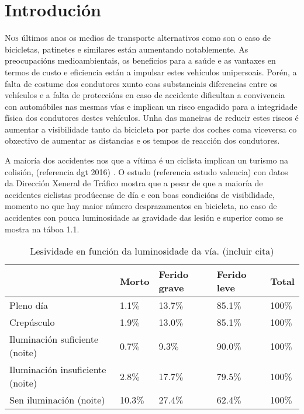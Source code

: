 \chapter{Introdución}
\label{chap:introducion}

\lettrine{N}{os} últimos anos os medios de transporte alternativos como son o caso de bicicletas, patinetes e similares están aumentando notablemente. As preocupacións medioambientais, os beneficios para a saúde e as vantaxes en termos de custo e eficiencia están a impulsar estes vehículos unipersoais. Porén, a falta de costume dos condutores xunto coas substanciais diferencias entre os vehículos e a falta de proteccións en caso de accidente dificultan a convivencia con automóbiles nas mesmas vías e implican un risco engadido para a integridade física dos condutores destes vehículos. Unha das maneiras de reducir estes riscos é aumentar a visibilidade tanto da bicicleta por parte dos coches coma viceversa co obxectivo de aumentar as distancias e os tempos de reacción dos condutores.

A maioría dos accidentes nos que a vítima é un ciclista implican un turismo na colisión, (referencia dgt 2016) .
O estudo (referencia estudo valencia) con datos da Dirección Xeneral de Tráfico mostra que a pesar de que a maioría de accidentes ciclistas prodúcense de día e con boas condicións de visibilidade, momento no que hay maior número desprazamentos en bicicleta, no caso de accidentes con pouca luminosidade as gravidade das lesión e superior como se mostra na táboa 1.1.


\begin{table}[tb]
    \label{c:lesividade}
    \begin{center}
        \begin{tabular}{|l|l|l|l|l|}
            \hline
             & Morto & Ferido grave & Ferido leve & Total\\ \hline
             Pleno día & 1.1\(\%\)& 13.7\(\%\) & 85.1\(\%\)& 100\(\%\)\\ \hline
             Crepúsculo & 1.9\(\%\) & 13.0\(\%\) &85.1\(\%\) &100\(\%\)\\ \hline
             Iluminación suficiente (noite) &0.7\(\%\) &9.3\(\%\) &90.0\(\%\)  & 100\(\%\)\\ \hline
             Iluminación insuficiente (noite)  & 2.8\(\%\)& 17.7\(\%\)& 79.5\(\%\)& 100\(\%\)\\ \hline
             Sen iluminación (noite) & 10.3\(\%\)& 27.4\(\%\)&62.4\(\%\) & 100\(\%\) \\ \hline
        \end{tabular}
    \end{center}
    \caption{Lesividade en función da luminosidade da vía. (incluir cita) }
    \label{tab:lesividade}
\end{table}

